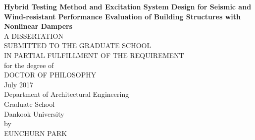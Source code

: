 \begin{titlepage}
\begin{center}
\vspace*{1.3cm}
\noindent \Large{\textbf{Hybrid Testing Method and Excitation System Design for Seismic and Wind-resistant Performance Evaluation of Building Structures with Nonlinear Dampers}} \\
\vspace*{1.9cm}
\noindent \Large {A DISSERTATION}\\
\vspace*{1.0cm}
\noindent \Large {SUBMITTED TO THE GRADUATE SCHOOL}\\
\noindent \Large {IN PARTIAL FULFILLMENT OF THE REQUIREMENT} \\
\vspace*{1.0cm}
\noindent \Large {for the degree of}\\
\vspace*{1.0cm}
\noindent \Large {DOCTOR OF PHILOSOPHY}\\
\vspace*{1.0cm}
\noindent \Large {July 2017} \\
\vspace*{1.0cm}
\noindent \Large {Department of Architectural Engineering} \\
\vspace*{0.1cm}
\noindent \Large {Graduate School}\\
\vspace*{0.1cm}
\noindent \Large {Dankook University} \\
\vspace*{1.0cm}
\noindent \Large {by} \\
\noindent \Large {EUNCHURN PARK} \\
\end{center}
\end{titlepage}
\newpage